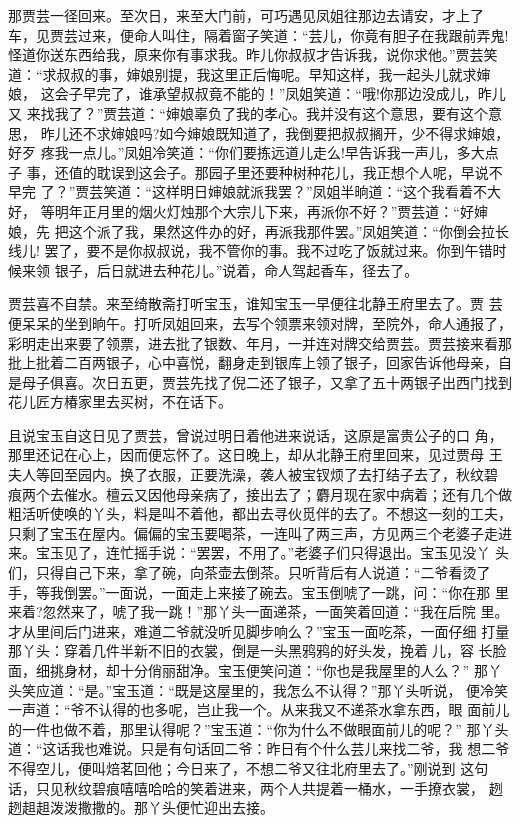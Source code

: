 那贾芸一径回来。至次日，来至大门前，可巧遇见凤姐往那边去请安，才上了
车，见贾芸过来，便命人叫住，隔着窗子笑道：“芸儿，你竟有胆子在我跟前弄鬼!
怪道你送东西给我，原来你有事求我。昨儿你叔叔才告诉我，说你求他。”贾芸笑
道：“求叔叔的事，婶娘别提，我这里正后悔呢。早知这样，我一起头儿就求婶娘，
这会子早完了，谁承望叔叔竟不能的！”凤姐笑道：“哦!你那边没成儿，昨儿又
来找我了？”贾芸道：“婶娘辜负了我的孝心。我并没有这个意思，要有这个意思，
昨儿还不求婶娘吗?如今婶娘既知道了，我倒要把叔叔搁开，少不得求婶娘，好歹
疼我一点儿。”凤姐冷笑道：“你们要拣远道儿走么!早告诉我一声儿，多大点子
事，还值的耽误到这会子。那园子里还要种树种花儿，我正想个人呢，早说不早完
了？”贾芸笑道：“这样明日婶娘就派我罢？”凤姐半晌道：“这个我看着不大好，
等明年正月里的烟火灯烛那个大宗儿下来，再派你不好？”贾芸道：“好婶娘，先
把这个派了我，果然这件办的好，再派我那件罢。”凤姐笑道：“你倒会拉长线儿!
罢了，要不是你叔叔说，我不管你的事。我不过吃了饭就过来。你到午错时候来领
银子，后日就进去种花儿。”说着，命人驾起香车，径去了。

贾芸喜不自禁。来至绮散斋打听宝玉，谁知宝玉一早便往北静王府里去了。贾
芸便呆呆的坐到晌午。打听凤姐回来，去写个领票来领对牌，至院外，命人通报了，
彩明走出来要了领票，进去批了银数、年月，一并连对牌交给贾芸。贾芸接来看那
批上批着二百两银子，心中喜悦，翻身走到银库上领了银子，回家告诉他母亲，自
是母子俱喜。次日五更，贾芸先找了倪二还了银子，又拿了五十两银子出西门找到
花儿匠方椿家里去买树，不在话下。

且说宝玉自这日见了贾芸，曾说过明日着他进来说话，这原是富贵公子的口
角，那里还记在心上，因而便忘怀了。这日晚上，却从北静王府里回来，见过贾母
王夫人等回至园内。换了衣服，正要洗澡，袭人被宝钗烦了去打结子去了，秋纹碧
痕两个去催水。檀云又因他母亲病了，接出去了；麝月现在家中病着；还有几个做
粗活听使唤的丫头，料是叫不着他，都出去寻伙觅伴的去了。不想这一刻的工夫，
只剩了宝玉在屋内。偏偏的宝玉要喝茶，一连叫了两三声，方见两三个老婆子走进
来。宝玉见了，连忙摇手说：“罢罢，不用了。”老婆子们只得退出。宝玉见没丫
头们，只得自己下来，拿了碗，向茶壶去倒茶。只听背后有人说道：“二爷看烫了
手，等我倒罢。”一面说，一面走上来接了碗去。宝玉倒唬了一跳，问：“你在那
里来着?忽然来了，唬了我一跳！”那丫头一面递茶，一面笑着回道：“我在后院
里。才从里间后门进来，难道二爷就没听见脚步响么？”宝玉一面吃茶，一面仔细
打量那丫头：穿着几件半新不旧的衣裳，倒是一头黑鸦鸦的好头发，挽着儿，容
长脸面，细挑身材，却十分俏丽甜净。宝玉便笑问道：“你也是我屋里的人么？”
那丫头笑应道：“是。”宝玉道：“既是这屋里的，我怎么不认得？”那丫头听说，
便冷笑一声道：“爷不认得的也多呢，岂止我一个。从来我又不递茶水拿东西，眼
面前儿的一件也做不着，那里认得呢？”宝玉道：“你为什么不做眼面前儿的呢？”
那丫头道：“这话我也难说。只是有句话回二爷：昨日有个什么芸儿来找二爷，我
想二爷不得空儿，便叫焙茗回他；今日来了，不想二爷又往北府里去了。”刚说到
这句话，只见秋纹碧痕嘻嘻哈哈的笑着进来，两个人共提着一桶水，一手撩衣裳，
趔趔趄趄泼泼撒撒的。那丫头便忙迎出去接。

